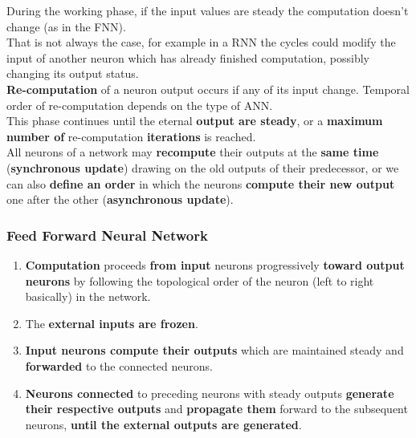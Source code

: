During the working phase, if the input values are steady the computation doesn't change (as in the FNN). \\
That is not always the case, for example in a RNN the cycles could modify the input of another neuron which has already finished computation, possibly changing its output status.\\

\textbf{Re-computation} of a neuron output occurs if any of its input change. Temporal order of re-computation depends on the type of ANN.\\
This phase continues until the eternal \textbf{output are steady}, or a \textbf{maximum number of} re-computation \textbf{iterations} is reached.\\

All neurons of a network may \textbf{recompute} their outputs at the \textbf{same time} (\textbf{synchronous update}) drawing on the old outputs of their predecessor, or we can also \textbf{define an order} in which the neurons \textbf{compute their new output} one after the other (\textbf{asynchronous update}).\\

\newpage

\subsubsection{Feed Forward Neural Network}
\begin{enumerate}
	\item \textbf{Computation} proceeds \textbf{from input} neurons progressively \textbf{toward output neurons} by following the topological order of the neuron (left to right basically) in the network.\\
	
	\item The \textbf{external inputs are frozen}.\\
	
	\item \textbf{Input neurons compute their outputs} which are maintained steady and \textbf{forwarded} to the connected neurons.\\
	
	\item \textbf{Neurons connected} to preceding neurons with steady outputs \textbf{generate their respective outputs} and \textbf{propagate them} forward to the subsequent neurons, \textbf{until the external outputs are generated}. \\
\end{enumerate}

